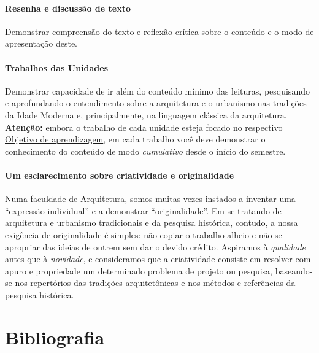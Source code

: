 \documentclass[
  11pt,
  brazil,
  a4paper,
]{article}
\begin{document}
\hypertarget{resenha-e-discussuxe3o-de-texto}{%
\paragraph{Resenha e discussão de
texto}\label{resenha-e-discussuxe3o-de-texto}}

Demonstrar compreensão do texto e reflexão crítica sobre o conteúdo e o
modo de apresentação deste.

\hypertarget{trabalhos-das-unidades}{%
\paragraph{Trabalhos das Unidades}\label{trabalhos-das-unidades}}

Demonstrar capacidade de ir além do conteúdo mínimo das leituras,
pesquisando e aprofundando o entendimento sobre a arquitetura e o
urbanismo nas tradições da Idade Moderna e, principalmente, na linguagem
clássica da arquitetura. \textbf{Atenção:} embora o trabalho de cada
unidade esteja focado no respectivo
\href{plano.md\#objetivos-de-aprendizagem}{Objetivo de aprendizagem}, em
cada trabalho você deve demonstrar o conhecimento do conteúdo de modo
\emph{cumulativo} desde o início do semestre.

\hypertarget{um-esclarecimento-sobre-criatividade-e-originalidade}{%
\paragraph{Um esclarecimento sobre criatividade e
originalidade}\label{um-esclarecimento-sobre-criatividade-e-originalidade}}

Numa faculdade de Arquitetura, somos muitas vezes instados a inventar
uma ``expressão individual'' e a demonstrar ``originalidade''. Em se
tratando de arquitetura e urbanismo tradicionais e da pesquisa
histórica, contudo, a nossa exigência de originalidade é simples: não
copiar o trabalho alheio e não se apropriar das ideias de outrem sem dar
o devido crédito. Aspiramos à \emph{qualidade} antes que à
\emph{novidade}, e consideramos que a criatividade consiste em resolver
com apuro e propriedade um determinado problema de projeto ou pesquisa,
baseando-se nos repertórios das tradições arquitetônicas e nos métodos e
referências da pesquisa histórica.

\hypertarget{bibliografia}{%
\section{Bibliografia}\label{bibliografia}}
\end{document}
